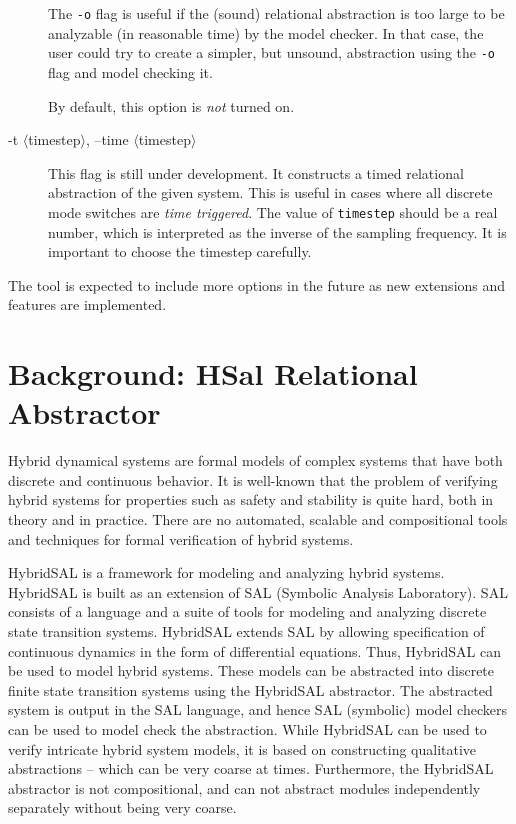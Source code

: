 \documentclass{article}
\begin{document}
\begin{description}
 The {\tt{-o}} flag is useful if the (sound) relational abstraction
 is too large to be analyzable (in reasonable time) by the model checker.
 In that case, the user could try to create a simpler, but unsound,
 abstraction using the {\tt{-o}} flag and model checking it.
 
 By default, this option is {\em{not}} turned on.

\item[-t $\langle$timestep$\rangle$, --time $\langle$timestep$\rangle$]
 This flag is still under development.
 It constructs  a timed relational abstraction of the given system.
 This is useful in cases where all discrete mode switches are
 {\em{time triggered}}.  The value of {\tt{timestep}} should be
 a real number, which is interpreted as the inverse of the
 sampling frequency.  It is important to choose the
 timestep carefully.
\end{description}

The tool is expected to include more options in the future
as new extensions and features are implemented.

\section{Background: HSal Relational Abstractor}

Hybrid dynamical systems are formal models of complex systems 
that have both discrete and continuous behavior.  
It is well-known that the problem of verifying hybrid systems for
properties such as safety and stability is quite
hard, both in theory and in practice.  There are no automated,
scalable and compositional tools and techniques for formal 
verification of hybrid systems.

HybridSAL is a framework for modeling and analyzing hybrid systems.
HybridSAL is built as an extension of SAL (Symbolic Analysis Laboratory).
SAL consists of a language and a suite of tools for modeling and 
analyzing discrete state transition systems.  HybridSAL extends SAL 
by allowing specification of continuous dynamics in the form of 
differential equations.
Thus, HybridSAL can be used to model hybrid systems.
These models can be abstracted into discrete  finite state transition
systems using the HybridSAL abstractor.  The abstracted system
is output in the SAL language, and hence SAL (symbolic) model 
checkers can be used to model check the abstraction.
While HybridSAL can be used to verify intricate hybrid system models,
it is based on constructing qualitative abstractions -- which can
be very coarse at times.  Furthermore, the HybridSAL abstractor is
not compositional, and can not abstract modules independently
separately without being very coarse.
\end{document}
